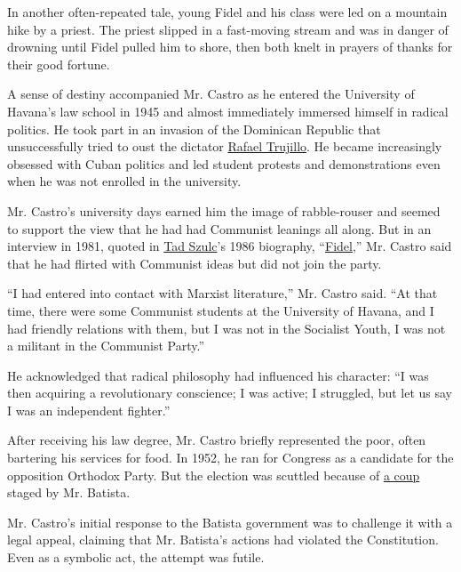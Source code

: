 In another often-repeated tale, young Fidel and his class were led on a
mountain hike by a priest. The priest slipped in a fast-moving stream
and was in danger of drowning until Fidel pulled him to shore, then both
knelt in prayers of thanks for their good fortune.

A sense of destiny accompanied Mr. Castro as he entered the University
of Havana's law school in 1945 and almost immediately immersed himself
in radical politics. He took part in an invasion of the Dominican
Republic that unsuccessfully tried to oust the dictator
\href{http://www.britannica.com/EBchecked/topic/607139/Rafael-Trujillo}{Rafael
Trujillo}. He became increasingly obsessed with Cuban politics and led
student protests and demonstrations even when he was not enrolled in the
university.

Mr. Castro's university days earned him the image of rabble-rouser and
seemed to support the view that he had had Communist leanings all along.
But in an interview in 1981, quoted in
\href{http://www.nytimes3xbfgragh.onion/2001/05/22/world/tad-szulc-74-dies-times-correspondent-who-uncovered-bay-of-pigs-imbroglio.html}{Tad
Szulc}'s 1986 biography,
``\href{http://www.nytimes3xbfgragh.onion/1986/11/30/books/power-unshared-and-total.html}{Fidel},''
Mr. Castro said that he had flirted with Communist ideas but did not
join the party.

``I had entered into contact with Marxist literature,'' Mr. Castro said.
``At that time, there were some Communist students at the University of
Havana, and I had friendly relations with them, but I was not in the
Socialist Youth, I was not a militant in the Communist Party.''

He acknowledged that radical philosophy had influenced his character:
``I was then acquiring a revolutionary conscience; I was active; I
struggled, but let us say I was an independent fighter.''

After receiving his law degree, Mr. Castro briefly represented the poor,
often bartering his services for food. In 1952, he ran for Congress as a
candidate for the opposition Orthodox Party. But the election was
scuttled because of
\href{http://timesmachine.nytimes3xbfgragh.onion/timesmachine/1952/03/11/84244252.html?pageNumber=1}{a
coup} staged by Mr. Batista.

Mr. Castro's initial response to the Batista government was to challenge
it with a legal appeal, claiming that Mr. Batista's actions had violated
the Constitution. Even as a symbolic act, the attempt was futile.

